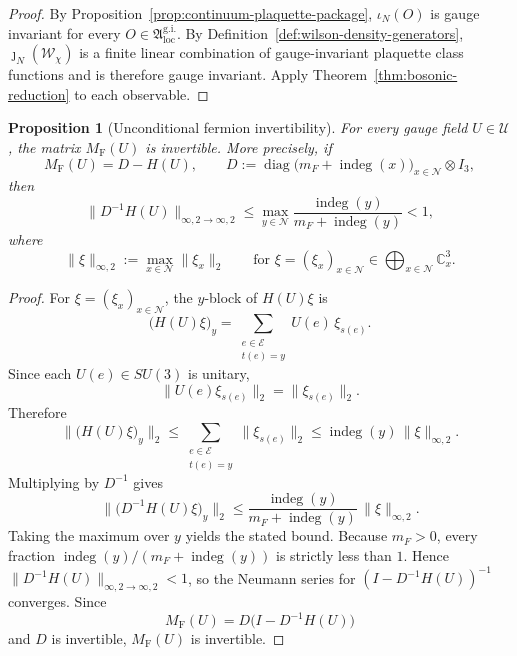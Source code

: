 \documentclass[11pt]{article}
\newtheorem{proposition}[theorem]{Proposition}
\theoremstyle{remark}
\newcommand{\C}{\mathbb C}
\newcommand{\mcN}{\mathcal N}
\newcommand{\mcE}{\mathcal E}
\newcommand{\mcU}{\mathscr U}
\newcommand{\diag}{\operatorname{diag}}
\newcommand{\indeg}{\operatorname{indeg}}
\begin{document}
\begin{proof}
By Proposition~\ref{prop:continuum-plaquette-package},
\(\iota_N(O)\) is gauge invariant for every
\(O\in\mathfrak A_{\mathrm{loc}}^{\mathrm{g.i.}}\).  By
Definition~\ref{def:wilson-density-generators},
\(\jmath_N(\mathcal W_\chi)\) is a finite linear combination of gauge-invariant
plaquette class functions and is therefore gauge invariant.  Apply
Theorem~\ref{thm:bosonic-reduction} to each observable.
\end{proof}

\begin{proposition}[Unconditional fermion invertibility]
\label{prop:fermion-invertible}
For every gauge field $U\in\mcU$, the matrix $M_{\mathrm F}(U)$ is invertible.
More precisely, if
\[
M_{\mathrm F}(U)=D-H(U),
\qquad
D:=\diag\bigl(m_F+\indeg(x)\bigr)_{x\in\mcN}\otimes I_3,
\]
then
\[
\|D^{-1}H(U)\|_{\infty,2\to\infty,2}
\le
\max_{y\in\mcN}\frac{\indeg(y)}{m_F+\indeg(y)}
<1,
\]
where
\[
\|\xi\|_{\infty,2}:=\max_{x\in\mcN}\|\xi_x\|_2
\qquad
\text{for }
\xi=(\xi_x)_{x\in\mcN}\in\bigoplus_{x\in\mcN}\C_x^3.
\]
\end{proposition}
\begin{proof}
For $\xi=(\xi_x)_{x\in\mcN}$, the $y$-block of $H(U)\xi$ is
\[
\bigl(H(U)\xi\bigr)_y
=
\sum_{\substack{e\in\mcE\\ t(e)=y}}U(e)\,\xi_{s(e)}.
\]
Since each $U(e)\in SU(3)$ is unitary,
\[
\|U(e)\xi_{s(e)}\|_2=\|\xi_{s(e)}\|_2.
\]
Therefore
\[
\bigl\|\bigl(H(U)\xi\bigr)_y\bigr\|_2
\le
\sum_{\substack{e\in\mcE\\ t(e)=y}}\|\xi_{s(e)}\|_2
\le
\indeg(y)\,\|\xi\|_{\infty,2}.
\]
Multiplying by $D^{-1}$ gives
\[
\bigl\|\bigl(D^{-1}H(U)\xi\bigr)_y\bigr\|_2
\le
\frac{\indeg(y)}{m_F+\indeg(y)}\,\|\xi\|_{\infty,2}.
\]
Taking the maximum over $y$ yields the stated bound.
Because $m_F>0$, every fraction $\indeg(y)/(m_F+\indeg(y))$ is strictly less
than $1$.  Hence $\|D^{-1}H(U)\|_{\infty,2\to\infty,2}<1$, so the Neumann
series for $(I-D^{-1}H(U))^{-1}$ converges.
Since
\[
M_{\mathrm F}(U)=D\bigl(I-D^{-1}H(U)\bigr)
\]
and $D$ is invertible, $M_{\mathrm F}(U)$ is invertible.
\end{proof}
\end{document}
